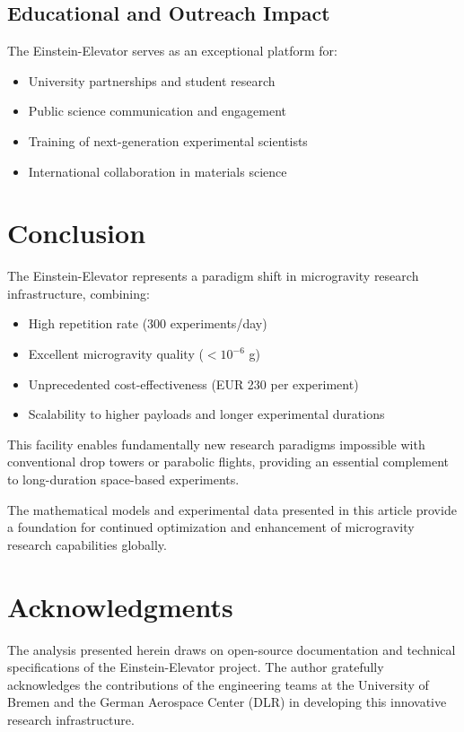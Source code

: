﻿\documentclass[a4paper,12pt]{article}
\theoremstyle{definition}
\begin{document}
\subsection{Educational and Outreach Impact}

The Einstein-Elevator serves as an exceptional platform for:
\begin{itemize}
	\item University partnerships and student research
	\item Public science communication and engagement
	\item Training of next-generation experimental scientists
	\item International collaboration in materials science
\end{itemize}

\section{Conclusion}

The Einstein-Elevator represents a paradigm shift in microgravity research infrastructure, combining:
\begin{itemize}
	\item High repetition rate (300 experiments/day)
	\item Excellent microgravity quality ($< 10^{-6}$ g)
	\item Unprecedented cost-effectiveness (EUR 230 per experiment)
	\item Scalability to higher payloads and longer experimental durations
\end{itemize}

This facility enables fundamentally new research paradigms impossible with conventional drop towers or parabolic flights, providing an essential complement to long-duration space-based experiments.

The mathematical models and experimental data presented in this article provide a foundation for continued optimization and enhancement of microgravity research capabilities globally.

\section*{Acknowledgments}

The analysis presented herein draws on open-source documentation and technical specifications of the Einstein-Elevator project. The author gratefully acknowledges the contributions of the engineering teams at the University of Bremen and the German Aerospace Center (DLR) in developing this innovative research infrastructure.
\end{document}
